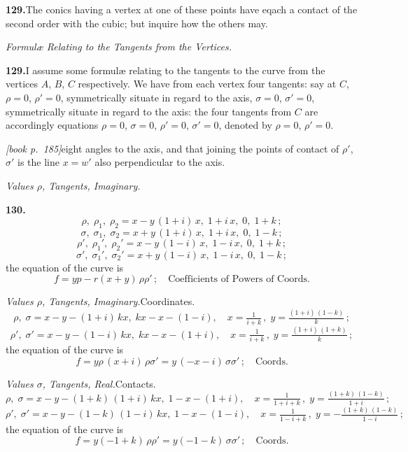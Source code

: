 \documentclass[11pt,a4paper]{article}
\begin{document}
\medskip\noindent\textbf{129.}\quad The conics having a vertex at one of these points have eqach a contact of the second order with the cubic; but inquire how the others may.

\medskip\noindent\textit{Formul\ae{} Relating to the Tangents from the Vertices.}

\medskip\noindent\textbf{129.}\quad I assume some formul\ae{} relating to the tangents to the curve from the vertices $A$, $B$, $C$ respectively. We have from each vertex four tangents: say at $C$, $\rho = 0$, $\rho' = 0$, symmetrically situate in regard to the axis, $\sigma = 0$, $\sigma' = 0$, symmetrically situate in regard to the axis: the four tangents from $C$ are accordingly equations $\rho = 0$, $\sigma = 0$, $\rho' = 0$, $\sigma' = 0$, denoted by $\rho = 0$, $\rho' = 0$.

\medskip\noindent\textit{[book p.~185]}\quad eight angles to the axis, and that joining the points of contact of $\rho'$, $\sigma'$ is the line $x = w'$ also perpendicular to the axis.

\medskip\noindent\textit{Values $\rho$, Tangents, Imaginary.}

\medskip\noindent\textbf{130.}\quad
\[
\rho,\;\rho_1,\;\rho_2 = x - y\,(1 + i)\,x,\;1 + i\,x,\;0,\;1 + k\,;
\]
\[
\sigma,\;\sigma_1,\;\sigma_2 = x + y\,(1 + i)\,x,\;1 + i\,x,\;0,\;1 - k\,;
\]
\[
\rho',\;\rho_1',\;\rho_2' = x - y\,(1 - i)\,x,\;1 - i\,x,\;0,\;1 + k\,;
\]
\[
\sigma',\;\sigma_1',\;\sigma_2' = x + y\,(1 - i)\,x,\;1 - i\,x,\;0,\;1 - k\,;
\]
the equation of the curve is
\[
f = yp - r(x + y)\,\rho\rho'\,;\quad\text{Coefficients of Powers of Coords.}
\]

\medskip\noindent\textit{Values $\rho$, Tangents, Imaginary.}\quad Coordinates.
\[
\rho,\;\sigma = x - y - (1 + i)\,k x,\;k x - x - (1 - i),\quad x = \tfrac{1}{i + k}\,,\;y = \tfrac{(1 + i)\,(1 - k)}{k}\,;
\]
\[
\rho',\;\sigma' = x - y - (1 - i)\,k x,\;k x - x - (1 + i),\quad x = \tfrac{1}{i + k}\,,\;y = \tfrac{(1 + i)\,(1 + k)}{k}\,;
\]
the equation of the curve is
\[
f = y\rho\,(x + i)\,\rho\sigma' = y\,(-x - i)\,\sigma\sigma'\,;\quad\text{Coords.}
\]

\medskip\noindent\textit{Values $\sigma$, Tangents, Real.}\quad Contacts.
\[
\rho,\;\sigma = x - y - (1 + k)\,(1 + i)\,k x,\;1 - x - (1 + i),\quad x = \tfrac{1}{1 + i + k}\,,\;y = \tfrac{(1 + k)\,(1 - k)}{1 + i}\,;
\]
\[
\rho',\;\sigma' = x - y - (1 - k)\,(1 - i)\,k x,\;1 - x - (1 - i),\quad x = \tfrac{1}{1 - i + k}\,,\;y = -\tfrac{(1 + k)\,(1 - k)}{1 - i}\,;
\]
the equation of the curve is
\[
f = y(-1 + k)\,\rho \rho' = y(-1 - k)\,\sigma\sigma'\,;\quad\text{Coords.}
\]
\end{document}
